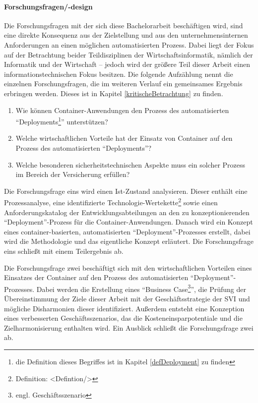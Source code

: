 \paragraph{Forschungsfragen/-design}
Die Forschungsfragen mit der sich diese Bachelorarbeit beschäftigen wird, sind eine direkte Konsequenz aus der Zielstellung und aus den unternehmensinternen Anforderungen an einen möglichen automatisierten Prozess. Dabei liegt der Fokus auf der Betrachtung beider Teildisziplinen der Wirtschaftsinformatik, nämlich der Informatik und der Wirtschaft -- jedoch wird der größere Teil dieser Arbeit einen informationstechnischen Fokus besitzen. Die folgende Aufzählung nennt die einzelnen Forschungsfragen, die im weiteren Verlauf ein gemeinsames Ergebnis erbringen werden. Dieses ist in Kapitel \vref{kritischeBetrachtung} zu finden.
\begin{enumerate}
	\item Wie können Container-Anwendungen den Prozess des automatisierten \enquote{Deployments\footnote{die Definition dieses Begriffes ist in Kapitel \vref{defDeployment} zu finden}} unterstützen?
	\item Welche wirtschaftlichen Vorteile hat der Einsatz von Container auf den Prozess des automatisierten \enquote{Deployments}?
	\item Welche besonderen sicherheitstechnischen Aspekte muss ein solcher Prozess im Bereich der Versicherung erfüllen?
\end{enumerate}
Die Forschungsfrage eins wird einen Ist-Zustand analysieren. Dieser enthält eine Prozessanalyse, eine identifizierte Technologie-Wertekette\footnote{Definition: <Defintion/>} sowie einen Anforderungskatalog der Entwicklungsabteilungen an den zu konzeptionierenden \enquote{Deployment}-Prozess für die Container-Anwendungen. Danach wird ein Konzept eines container-basierten, automatisierten \enquote{Deployment}-Prozesses erstellt, dabei wird die Methodologie und das eigentliche Konzept erläutert. Die Forschungsfrage eins schließt mit einem Teilergebnis ab. \par
Die Forschungsfrage zwei beschäftigt sich mit den wirtschaftlichen Vorteilen eines Einsatzes der Container auf den Prozess des automatisierten \enquote{Deployment}-Prozesses. Dabei werden die Erstellung eines \enquote{Business Case\footnote{engl. Geschäftsszenario}}, die Prüfung der Übereinstimmung der Ziele dieser Arbeit mit der Geschäftsstrategie der \ac{SVI} und mögliche Disharmonien dieser identifiziert. Außerdem entsteht eine Konzeption eines verbesserten Geschäftsszenarios, das die Kosteneinsparpotentiale und die Zielharmonisierung enthalten wird. Ein Ausblick schließt die Forschungsfrage zwei ab. \par
